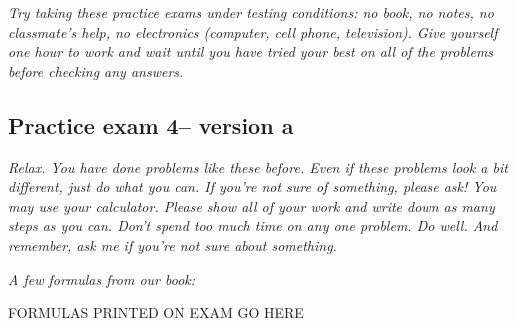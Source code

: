 \documentclass[12pt]{article}
\begin{document}
\emph{Try taking these practice exams under testing conditions:  no book, no notes, no classmate's help, no electronics (computer, cell phone, television). Give yourself one hour to work and wait until you have tried your best on all of the problems before checking any answers.}
\bigskip

\subsection*{Practice exam 4-- version a}
\bigskip
 \emph{Relax.  You have done problems like these before.  Even if these problems look a bit different, just do what you can.  If you're not sure of something, please ask! You may use your calculator.  Please show all of your work and write down as many steps as you can.  Don't spend too much time on any one problem.  Do well.  And remember, ask me if you're not sure about something.}
 
\bigskip
 
\emph{A few formulas from our book:}

\begin{center}

FORMULAS PRINTED ON EXAM GO HERE

\end{center}

\hspace{-.25in} \hrulefill
\end{document}
